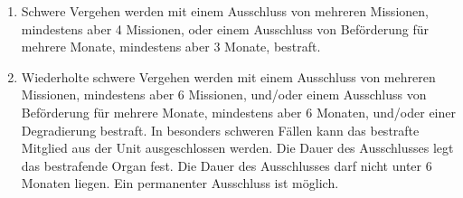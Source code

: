 \begin{enumerate}[label=(\arabic*)]
    \item\label{itm:strafe_schwerer_verstoß} Schwere Vergehen werden mit einem Ausschluss von mehreren Missionen, mindestens aber 4 Missionen, oder einem Ausschluss von Beförderung für mehrere Monate, mindestens aber 3 Monate, bestraft.   
    \item Wiederholte schwere Vergehen werden mit einem Ausschluss von mehreren Missionen, mindestens aber 6 Missionen, und/oder einem Ausschluss von Beförderung für mehrere Monate, mindestens aber 6 Monaten, und/oder einer Degradierung bestraft. In besonders schweren Fällen kann das bestrafte Mitglied aus der Unit ausgeschlossen werden. Die Dauer des Ausschlusses legt das bestrafende Organ fest. Die Dauer des Ausschlusses darf nicht unter 6 Monaten liegen. Ein permanenter Ausschluss ist möglich.
\end{enumerate}
